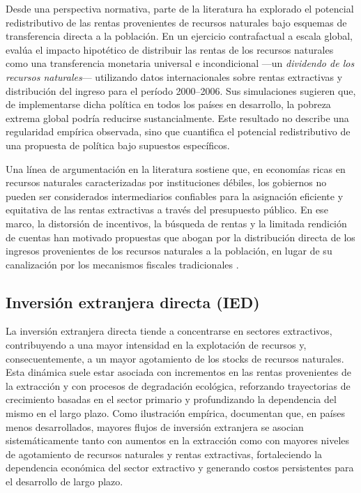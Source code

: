 \documentclass[../../PTFM.tex]{subfiles}
\begin{document}
	Desde una perspectiva normativa, parte de la literatura ha explorado el potencial redistributivo de las rentas provenientes de recursos naturales bajo esquemas de transferencia directa a la población. En un ejercicio contrafactual a escala global, \textcite{Segal2011} evalúa el impacto hipotético de distribuir las rentas de los recursos naturales como una transferencia monetaria universal e incondicional —un \textit{dividendo de los recursos naturales}— utilizando datos internacionales sobre rentas extractivas y distribución del ingreso para el período 2000–2006. Sus simulaciones sugieren que, de implementarse dicha política en todos los países en desarrollo, la pobreza extrema global podría reducirse sustancialmente. Este resultado no describe una regularidad empírica observada, sino que cuantifica el potencial redistributivo de una propuesta de política bajo supuestos específicos.
	
	Una línea de argumentación en la literatura sostiene que, en economías ricas en recursos naturales caracterizadas por instituciones débiles, los gobiernos no pueden ser considerados intermediarios confiables para la asignación eficiente y equitativa de las rentas extractivas a través del presupuesto público. En ese marco, la distorsión de incentivos, la búsqueda de rentas y la limitada rendición de cuentas han motivado propuestas que abogan por la distribución directa de los ingresos provenientes de los recursos naturales a la población, en lugar de su canalización por los mecanismos fiscales tradicionales \parencite{Gupta2014}.
	
	\subsection{Inversión extranjera directa (IED)}
	\label{subsec:IED}
	
	La inversión extranjera directa tiende a concentrarse en sectores extractivos, contribuyendo a una mayor intensidad en la explotación de recursos y, consecuentemente, a un mayor agotamiento de los stocks de recursos naturales. Esta dinámica suele estar asociada con incrementos en las rentas provenientes de la extracción y con procesos de degradación ecológica, reforzando trayectorias de crecimiento basadas en el sector primario y profundizando la dependencia del mismo en el largo plazo. Como ilustración empírica, \textcite{Long2017} documentan que, en países menos desarrollados, mayores flujos de inversión extranjera se asocian sistemáticamente tanto con aumentos en la extracción como con mayores niveles de agotamiento de recursos naturales y rentas extractivas, fortaleciendo la dependencia económica del sector extractivo y generando costos persistentes para el desarrollo de largo plazo.
	
\end{document}
